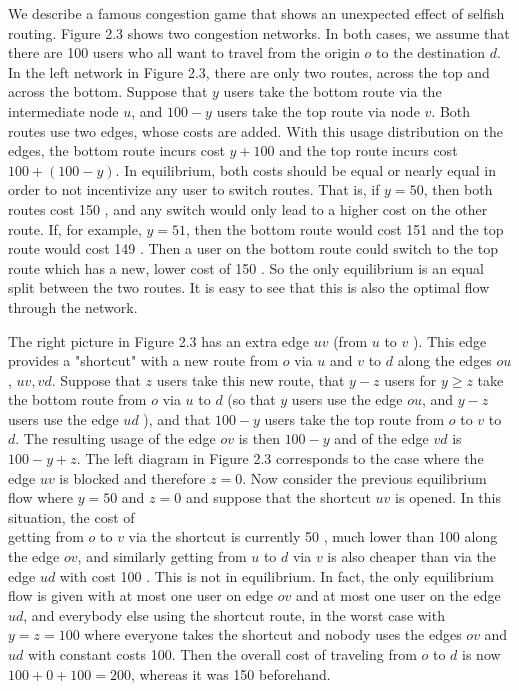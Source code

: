 \documentclass[12pt]{article}
\begin{document}
We describe a famous congestion game that shows an unexpected effect of selfish routing. Figure 2.3 shows two congestion networks. In both cases, we assume that there are 100 users who all want to travel from the origin $o$ to the destination $d$. In the left network in Figure 2.3, there are only two routes, across the top and across the bottom. Suppose that $y$ users take the bottom route via the intermediate node $u$, and $100-y$ users take the top route via node $v$. Both routes use two edges, whose costs are added. With this usage distribution on the edges, the bottom route incurs cost $y+100$ and the top route incurs cost $100+(100-y)$. In equilibrium, both costs should be equal or nearly equal in order to not incentivize any user to switch routes. That is, if $y=50$, then both routes cost 150 , and any switch would only lead to a higher cost on the other route. If, for example, $y=51$, then the bottom route would cost 151 and the top route would cost 149 . Then a user on the bottom route could switch to the top route which has a new, lower cost of 150 . So the only equilibrium is an equal split between the two routes. It is easy to see that this is also the optimal flow through the network.

The right picture in Figure 2.3 has an extra edge $u v$ (from $u$ to $v$ ). This edge provides a "shortcut" with a new route from $o$ via $u$ and $v$ to $d$ along the edges $o u$, $u v, v d$. Suppose that $z$ users take this new route, that $y-z$ users for $y \geq z$ take the bottom route from $o$ via $u$ to $d$ (so that $y$ users use the edge $o u$, and $y-z$ users use the edge $u d$ ), and that $100-y$ users take the top route from $o$ to $v$ to $d$. The resulting usage of the edge $o v$ is then $100-y$ and of the edge $v d$ is $100-y+z$. The left diagram in Figure 2.3 corresponds to the case where the edge $u v$ is blocked and therefore $z=0$. Now consider the previous equilibrium flow where $y=50$ and $z=0$ and suppose that the shortcut $u v$ is opened. In this situation, the cost of\\
getting from $o$ to $v$ via the shortcut is currently 50 , much lower than 100 along the edge $o v$, and similarly getting from $u$ to $d$ via $v$ is also cheaper than via the edge $u d$ with cost 100 . This is not in equilibrium. In fact, the only equilibrium flow is given with at most one user on edge $o v$ and at most one user on the edge $u d$, and everybody else using the shortcut route, in the worst case with $y=z=100$ where everyone takes the shortcut and nobody uses the edges $o v$ and $u d$ with constant costs 100. Then the overall cost of traveling from $o$ to $d$ is now $100+0+100=200$, whereas it was 150 beforehand.
\end{document}
